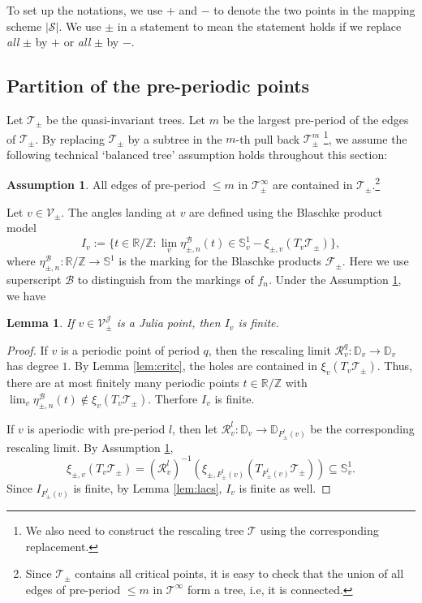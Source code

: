 \documentclass[11pt, reqno]{amsart}
\numberwithin{equation}{section}
\theoremstyle{plain}
\theoremstyle{theorem}
\newtheorem{lem}[theorem]{Lemma}
\theoremstyle{definition}
\newtheorem{assumption}[theorem]{Assumption}
\newcommand{\R}{\mathbb{R}}
\newcommand{\Z}{\mathbb{Z}}
\newcommand{\D}{\mathbb{D}}
\newcommand{\RT}{\mathscr{T}}
\newcommand{\bp}{\mathcal{F}}
\numberwithin{figure}{section}
\begin{document}
To set up the notations,
we use $+$ and $-$ to denote the two points in the mapping scheme $|\mathcal{S}|$.
We use $\pm$ in a statement to mean the statement holds if we replace {\em all} $\pm$ by $+$ or {\em all} $\pm$ by $-$.



\subsection{Partition of the pre-periodic points}
Let $\mathcal{T}_\pm$ be the quasi-invariant trees.
Let $m$ be the largest pre-period of the edges of $\mathcal{T}_\pm$.
By replacing $\mathcal{T}_\pm$ by a subtree in the $m$-th pull back $\mathcal{T}_\pm^m$ \footnote{We also need to construct the rescaling tree $\RT$ using the corresponding replacement.}, we assume the following technical `balanced tree' assumption holds throughout this section:
\begin{assumption}\label{assumption:1}
All edges of pre-period $\leq m$ in $\mathcal{T}_\pm^\infty$ are contained in $\mathcal{T}_\pm$.\footnote{Since $\mathcal{T}_\pm$ contains all critical points, it is easy to check that the union of all edges of pre-period $\leq m$ in $\mathcal{T}^\infty$ form a tree, i.e, it is connected.}
\end{assumption}

Let $v\in \mathcal{V}_\pm$. The angles landing at $v$ are defined using the Blaschke product model
$$
I_v := \{t\in \R/\Z: \lim_v \eta_{\pm, n}^\mathcal{B}(t) \in \mathbb{S}_v^1- \xi_{\pm, v}(T_v\mathcal{T}_\pm)\},
$$
where $\eta_{\pm, n}^\mathcal{B}: \R/\Z \rightarrow \mathbb{S}^1$ is the marking for the Blaschke products $\bp_\pm$.
Here we use superscript $\mathcal{B}$ to distinguish from the markings of $f_n$.
Under the Assumption \ref{assumption:1}, we have
\begin{lem}\label{lem:JF}
If $v \in \mathcal{V}_\pm^\mathcal{J}$ is a Julia point, then $I_v$ is finite.
\end{lem}
\begin{proof}
If $v$ is a periodic point of period $q$, then the rescaling limit $\mathcal{R}^q_v: \D_v \longrightarrow \D_v$ has degree $1$.
By Lemma \ref{lem:critc}, the holes are contained in $\xi_v(T_v \mathcal{T}_\pm)$. 
Thus, there are at most finitely many periodic points $t\in \R/\Z$ with $\lim_v \eta_{\pm, n}^\mathcal{B}(t) \notin \xi_v(T_v\mathcal{T}_\pm)$.
Therfore $I_v$ is finite.

If $v$ is aperiodic with pre-period $l$, then let $\mathcal{R}^l_v: \D_v \longrightarrow \D_{F_\pm^l(v)}$ be the corresponding rescaling limit.
By Assumption \ref{assumption:1}, 
$$
\xi_{\pm,v}(T_v\mathcal{T}_\pm) = (\mathcal{R}^l_v)^{-1} (\xi_{\pm,F_\pm^l(v)}(T_{F_\pm^l(v)}\mathcal{T}_\pm)) \subseteq \mathbb{S}^1_v.
$$
Since $I_{F_\pm^l(v)}$ is finite, by Lemma \ref{lem:lacs}, $I_v$ is finite as well.
\end{proof}
\end{document}
